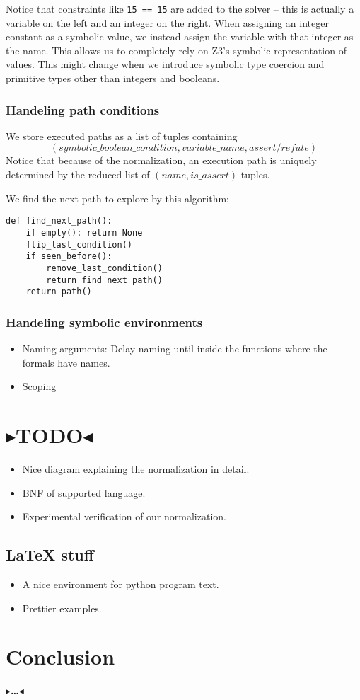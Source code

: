 \documentclass[11pt]{report}
\newcommand{\todo}[1]{{\color[rgb]{.5,0,0}\textbf{$\blacktriangleright$#1$\blacktriangleleft$}}}
\begin{document}
Notice that constraints like \verb|15 == 15| are added to the solver
-- this is actually a variable on the left and an integer on the
right. When assigning an integer constant as a symbolic value, we
instead assign the variable with that integer as the name. This allows
us to completely rely on Z3's symbolic representation of values. This
might change when we introduce symbolic type coercion and primitive
types other than integers and booleans.

\subsection{Handeling path conditions}
We store executed paths as a list of tuples containing
$$(symbolic\_boolean\_condition, variable\_name, assert/refute)$$
Notice that because of the normalization, an execution path is
uniquely determined by the reduced list of $(name, is\_assert)$
tuples.

We find the next path to explore by this algorithm:
\begin{verbatim}
def find_next_path():
    if empty(): return None
    flip_last_condition()
    if seen_before():
        remove_last_condition()
        return find_next_path()
    return path()
\end{verbatim}

\subsection{Handeling symbolic environments}
\begin{itemize}
\item Naming arguments: Delay naming until inside the functions where
  the formals have names.
\item Scoping
\end{itemize}


\chapter{\todo{TODO}}

\begin{itemize}
  \item Nice diagram explaining the normalization in detail.
  \item BNF of supported language.
  \item Experimental verification of our normalization.
\end{itemize}

\section{\LaTeX{} stuff}

\begin{itemize}
  \item A nice environment for python program text.
  \item Prettier examples.
\end{itemize}


\chapter{Conclusion}
\label{ch:conclusion}

\todo{\dots}
\end{document}

